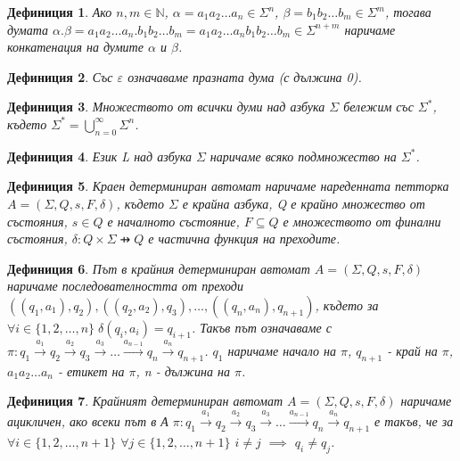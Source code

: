 \documentclass[a4paper,12pt]{article}
\newtheorem{defn}{Дефиниция}[section]
\begin{document}
\begin{defn}
Ако $n, m \in \mathbb N$, $\alpha = a_1 a_2 \ldots a_n \in \Sigma^n$, $\beta = b_1 b_2 \ldots b_m \in \Sigma^m$, тогава думата
$\alpha . \beta = a_1 a_2 \ldots a_n . b_1 b_2 \ldots b_m = a_1 a_2 \ldots a_n b_1 b_2 \ldots b_m \in \Sigma^{n+m}$ наричаме конкатенация на думите $\alpha$ и $\beta$.
\end{defn}

\begin{defn}
Със $\varepsilon$ означаваме празната дума (с дължина 0).
\end{defn}

\begin{defn}
Множеството от всички думи над азбука $\Sigma$ бележим със $\Sigma^*$, където $\Sigma^* = \bigcup\limits_{n=0}^{\infty} \Sigma^n$.
\end{defn}

\begin{defn}
Език L над азбука $\Sigma$ наричаме всяко подмножество на $\Sigma^*$.
\end{defn}

\begin{defn}
Краен детерминиран автомат наричаме нареденната петторка $A = ( \Sigma, Q, s, F, \delta )$, където
$\Sigma$ е крайна азбука, Q е крайно множество от състояния, $s \in Q$ е началното състояние, $F \subseteq Q$ е множеството от финални състояния,
$\delta : Q \times \Sigma \pfun Q$ е частична функция на преходите.
\end{defn}

\begin{defn}
Път в крайния детерминиран автомат $A = ( \Sigma, Q, s, F, \delta )$ наричаме последователността от преходи
$((q_1, a_1), q_2), ((q_2, a_2), q_3), \ldots, ((q_n, a_n), q_{n+1})$, където за $\forall i \in \{1, 2, \ldots, n\} \;\delta(q_i, a_i)=q_{i+1}$.
Такъв път означаваме с $\pi: q_1 \xrightarrow{a_1} q_2 \xrightarrow{a_2} q_3 \xrightarrow{a_3} \ldots \xrightarrow{a_{n  - 1}} q_n \xrightarrow{a_n} q_{n+1}$.
$q_1$ наричаме начало на $\pi$, $q_{n + 1}$ - край на $\pi$, $a_1 a_2 \ldots a_n$ - етикет на $\pi$, n - дължина на $\pi$.
\end{defn}

\begin{defn}
Крайният детерминиран автомат $A = ( \Sigma, Q, s, F, \delta )$ наричаме ацикличен, ако всеки път в А
$\pi: q_1 \xrightarrow{a_1} q_2 \xrightarrow{a_2} q_3 \xrightarrow{a_3} \ldots \xrightarrow{a_{n  - 1}} q_n \xrightarrow{a_n} q_{n+1}$
е такъв, че за $\forall i \in \{1, 2, \ldots, n+1\}$ $\forall j \in \{1, 2, \ldots, n+1\}$ $i \neq j$ $\implies$ $q_i \neq q_j$.
\end{defn}
\end{document}
